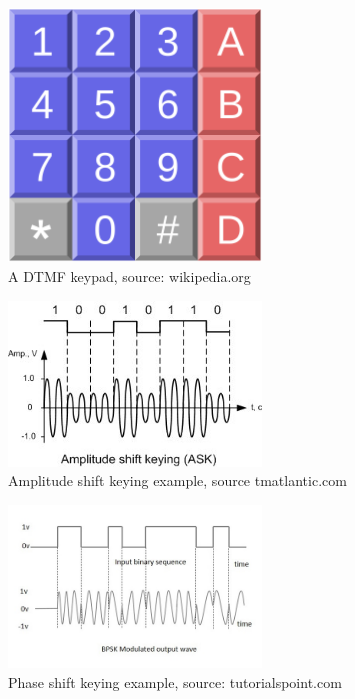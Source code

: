 \documentclass[twocolumn,14pt]{extarticle}
\begin{document}
\begin{figure}[!ht]
\begin{center}
\includegraphics[width=0.6\textwidth]{figure/dtmfkeypad.png}
\caption{A DTMF keypad, source: wikipedia.org}
\label{appendix:fig:dtmfkeypad}
\end{center}
\end{figure}

\begin{figure}[!ht]
\begin{center}
\includegraphics[width=0.6\textwidth]{figure/ask.jpg}
\caption{Amplitude shift keying example, source tmatlantic.com}
\label{appendix:fig:ask}
\end{center}
\end{figure}

\begin{figure}[!ht]
\begin{center}
\includegraphics[width=0.6\textwidth]{figure/psk.jpg}
\caption{Phase shift keying example, source: tutorialspoint.com}
\label{appendix:fig:psk}
\end{center}
\end{figure}
\end{document}
